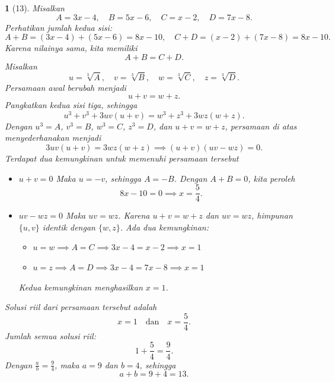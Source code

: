 \documentclass[11pt,a4paper,DIV=12]{scrartcl}
\theoremstyle{problemstyle}
\theoremstyle{answerstyle}
\newtheorem{answer}{}
\begin{document}
\begin{answer}[13]
  Misalkan
  \[
    A = 3x - 4, \quad B = 5x - 6, \quad C = x - 2, \quad D = 7x - 8.
  \]
  Perhatikan jumlah kedua sisi:
  \[
    A + B = (3x-4) + (5x-6) = 8x - 10, \quad
    C + D = (x-2) + (7x-8) = 8x - 10.
  \]
  Karena nilainya sama, kita memiliki
  \[
    A + B = C + D.
  \]
  Misalkan
  \[
    u = \sqrt[3]{A}, \quad v = \sqrt[3]{B}, \quad w = \sqrt[3]{C}, \quad z = \sqrt[3]{D}.
  \]
  Persamaan awal berubah menjadi
  \[
    u + v = w + z.
  \]
  Pangkatkan kedua sisi tiga, sehingga
  \[
    u^3 + v^3 + 3uv(u+v) = w^3 + z^3 + 3wz(w+z).
  \]
  Dengan $u^3 = A$, $v^3 = B$, $w^3 = C$, $z^3 = D$, dan $u+v = w+z$, persamaan di atas menyederhanakan menjadi
  \[
    3uv(u+v) = 3wz(w+z) \implies (u+v)(uv - wz) = 0.
  \]
  Terdapat dua kemungkinan untuk memenuhi persamaan tersebut
  \begin{itemize}
    \item $u + v = 0$
          Maka $u = -v$, sehingga $A = -B$. Dengan $A+B = 0$, kita peroleh
          \[
            8x - 10 = 0 \implies x = \frac{5}{4}.
          \]
    \item  $uv - wz = 0$
          Maka $uv = wz$. Karena $u+v = w+z$ dan $uv = wz$, himpunan $\{u,v\}$ identik dengan $\{w,z\}$. Ada dua kemungkinan:
          \begin{itemize}
            \item $u = w \implies A = C \implies 3x-4 = x-2 \implies x = 1$
            \item $u = z \implies A = D \implies 3x-4 = 7x-8 \implies x = 1$
          \end{itemize}
          Kedua kemungkinan menghasilkan $x = 1$.
  \end{itemize}
  Solusi riil dari persamaan tersebut adalah
  \[
    x = 1 \quad \text{dan} \quad x = \frac{5}{4}.
  \]
  Jumlah semua solusi riil:
  \[
    1 + \frac{5}{4} = \frac{9}{4}.
  \]
  Dengan $\frac{a}{b} = \frac{9}{4}$, maka $a = 9$ dan $b = 4$, sehingga
  \[
    a+b = 9+4 = \boxed{13}.
  \]
\end{answer}
\end{document}

